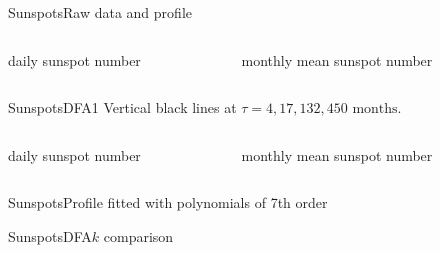 \documentclass{beamer}
\begin{document}
\begin{frame}{Sunspots}{Raw data and profile}
	\begin{columns}
		\begin{column}{.47\textwidth}
			\centering
			\begin{block}{\small{daily sunspot number}}
				\scalebox{.7}{}
				\scalebox{.7}{}
			\end{block}
		\end{column}
		\hfill
		\begin{column}{.47\textwidth}
			\centering
			\begin{block}{\small{monthly mean sunspot number}}
				\scalebox{.7}{}
				\scalebox{.7}{}
			\end{block}
		\end{column}
	\end{columns}
\end{frame}

\begin{frame}{Sunspots}{DFA1}	
		\small{Vertical black lines at $\tau = 4,17, 132, 450 \text{ months}$.}
	\begin{columns}
		\begin{column}{.47\textwidth}
			\centering
			\begin{block}{\small{daily sunspot number}}
			\scalebox{.7}{}
			\end{block}
		\end{column}
		\hfill
		\begin{column}{.47\textwidth}
			\centering
			\begin{block}{\small{monthly mean sunspot number}}
			\scalebox{.7}{}
			\end{block}
		\end{column}
	\end{columns}
\end{frame}

\begin{frame}{Sunspots}{Profile fitted with polynomials of 7th order}
			\centering
			\scalebox{.7}{}
\end{frame}

\begin{frame}{Sunspots}{DFA$k$ comparison}
		\centering
		\scalebox{.7}{}
\end{frame}
\end{document}

